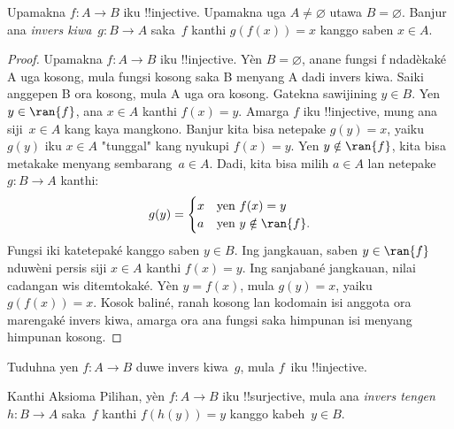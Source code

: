 \documentclass[../../../include/open-logic-section]{subfiles}
\begin{document}
\begin{prop}
Upamakna $f\colon A \to B$ iku !!{injective}. Upamakna uga $A\ne\varnothing$ utawa $B=\varnothing$.
Banjur ana \emph{invers kiwa}~$g\colon B \to A$ saka~$f$
kanthi $g(f(x)) = x$ kanggo saben $x \in A$.
\end{prop}

\begin{proof}
Upamakna $f\colon A \to B$ iku !!{injective}. Yèn $B=\varnothing$,
anane fungsi f ndadèkaké A uga kosong, mula fungsi kosong saka B
menyang A dadi invers kiwa. Saiki anggepen
B ora kosong, mula A uga ora kosong. Gatekna sawijining $y \in B$.
Yen $y \in \ran{f}$, ana $x \in A$ kanthi $f(x) = y$. Amarga
$f$ iku !!{injective}, mung ana siji~$x \in A$ kang kaya mangkono. Banjur kita bisa
netepake $g(y) = x$, yaiku $g(y)$ iku $x \in A$ "tunggal" kang nyukupi $f(x)
= y$. Yen $y \notin \ran{f}$, kita bisa metakake menyang sembarang~$a \in A$.
Dadi, kita bisa milih $a \in A$ lan netepake $g\colon B \to A$ kanthi:
\[
g(y) = \begin{cases}
    x & \text{yen $f(x) = y$}\\
    a & \text{yen $y \notin \ran{f}$.}
\end{cases}
\]
Fungsi iki katetepaké kanggo saben $y \in B$. Ing jangkauan, saben
$y \in \ran{f}$ nduwèni persis siji $x \in A$ kanthi $f(x) = y$.
Ing sanjabané jangkauan, nilai cadangan wis ditemtokaké. Yèn
$y = f(x)$, mula $g(y) = x$, yaiku $g(f(x)) = x$.
Kosok baliné, ranah kosong lan kodomain isi anggota ora marengaké
invers kiwa, amarga ora ana fungsi saka himpunan isi menyang himpunan kosong.
\end{proof}

\begin{prob}
Tuduhna yen $f\colon A \to B$ duwe invers kiwa~$g$, mula $f$~iku
!!{injective}.
\end{prob}

\begin{prop}
    Kanthi Aksioma Pilihan, yèn $f\colon A \to B$ iku !!{surjective}, mula ana
    \emph{invers tengen}~$h\colon B \to A$ saka~$f$ kanthi $f(h(y)) =
    y$ kanggo kabeh~$y \in B$.
\end{prop}
\end{document}
